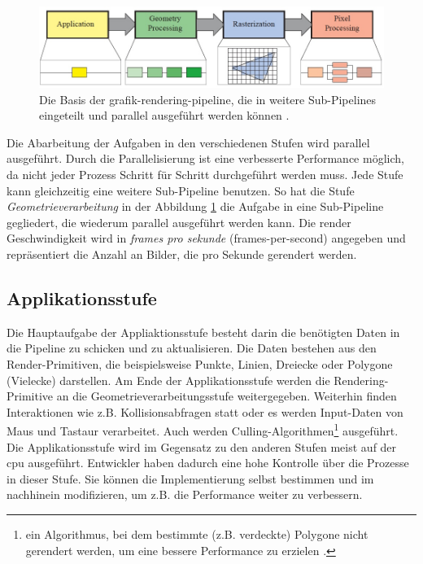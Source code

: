 \begin{figure}[h]
    \centering
    \includegraphics[width=\textwidth]{img/Render/render_pipeline_2.jpg}
    \caption{Die Basis der \acrshort{grafik-rendering-pipeline}, die in weitere Sub-Pipelines eingeteilt und parallel ausgeführt werden können \cite*{moeller2019}.}
    \label{fig:renderpipeline2}
\end{figure}

Die Abarbeitung der Aufgaben in den verschiedenen Stufen wird parallel ausgeführt. Durch die Parallelisierung ist eine verbesserte Performance möglich, da nicht jeder Prozess Schritt für Schritt durchgeführt werden muss. Jede Stufe kann gleichzeitig eine weitere Sub-Pipeline benutzen. So hat die Stufe \textit{Geometrieverarbeitung} in der Abbildung \ref*{fig:renderpipeline2} die Aufgabe in eine Sub-Pipeline gegliedert, die wiederum parallel ausgeführt werden kann. Die render Geschwindigkeit wird in \textit{frames pro sekunde} (\acrshort{frames-per-second}) angegeben und repräsentiert die Anzahl an Bilder, die pro Sekunde gerendert werden\cite*[Moeller (2019)]{moeller2019}. 

\subsection{Applikationsstufe}
Die Hauptaufgabe der Appliaktionsstufe besteht darin die benötigten Daten in die Pipeline zu schicken und zu aktualisieren. Die Daten bestehen aus den Render-Primitiven, die beispielsweise Punkte, Linien, Dreiecke oder Polygone (Vielecke) darstellen. Am Ende der Applikationsstufe werden die Rendering-Primitive an die Geometrieverarbeitungsstufe weitergegeben. Weiterhin finden Interaktionen wie z.B. Kollisionsabfragen statt oder es werden Input-Daten von Maus und Tastaur verarbeitet. Auch werden Culling-Algorithmen\footnote{ein Algorithmus, bei dem bestimmte (z.B. verdeckte) Polygone nicht gerendert werden, um eine bessere Performance zu erzielen \cite*{coorg1997}.} ausgeführt. Die Applikationsstufe wird im Gegensatz zu den anderen Stufen meist auf der \acrshort{cpu} ausgeführt. Entwickler haben dadurch eine hohe Kontrolle über die Prozesse in dieser Stufe. Sie können die Implementierung selbst bestimmen und im nachhinein modifizieren, um z.B. die Performance weiter zu verbessern\cite*[Moeller (2019)]{moeller2019}.

